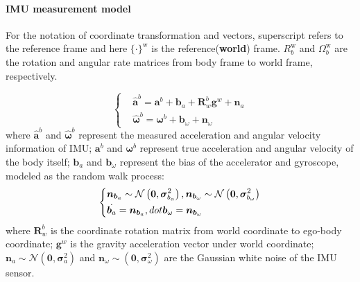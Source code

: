 \documentclass[12pt]{article}   %
\begin{document}
\paragraph{IMU measurement model}
For the notation of coordinate transformation and vectors, superscript refers to
the reference frame and here $\{\cdot\}^{\mathrm{w}}$ is the
reference(\textbf{world}) frame. $R_b^{\mathrm{w}}$ and $\Omega_b^{\mathrm{w}}$
are the rotation and angular rate matrices from body frame to world frame,
respectively.


\begin{equation}
	\left\{
	\begin{aligned}
	&\hat{\bm{a}}^b=\bm{a}^b+\bm{b}_a+\bm{R}_w^b\bm{g}^w+\bm{n}_a\\
	&\hat{\bm{\omega}}^b=\bm{\omega}^b+\bm{b}_\omega+\bm{n}_\omega
	\end{aligned}
	\right.
	\label{eq.measurement_model}
\end{equation}
where $\hat{\bm{a}}^b$ and $\hat{\bm{\omega}}^b$ represent the measured
acceleration and angular velocity information of IMU; $\bm{a}^b$ and
$\bm{\omega}^b$ represent true acceleration and angular velocity of the body
itself; $\bm{b}_a$ and $\bm{b}_\omega$ represent the bias of the accelerator and
gyroscope, modeled as the random walk process:
\begin{equation}
\centering
	\left\{
	\begin{aligned}
	&\bm{n}_{\bm{b}_a}\sim\mathcal{N}\left(\bm{0},\bm{\sigma}_{b_a}^2\right),\bm{n}_{\bm{b}_\omega}\sim\mathcal{N}\left(\bm{0},\bm{\sigma}_{b_\omega}^2\right)\\
	&\dot{\bm{b}_a}=\bm{n}_{\bm{b}_a},dot{\bm{b}_\omega}=\bm{n}_{\bm{b}_\omega}
	\end{aligned}
	\right.
	\label{eq.error_model}
\end{equation}
where $\bm{R}_w^b$ is the coordinate rotation matrix from world coordinate to
ego-body coordinate; $\bm{g}^w$ is the gravity acceleration vector under world
coordinate; $\bm{n}_a\sim\mathcal{N}\left(\bm{0},\bm{\sigma}_a^2\right)$ and
$\bm{n}_\omega\sim\left(\bm{0},\bm{\sigma}_\omega^2\right)$ are the Gaussian
white noise of the IMU sensor.
	
\end{document}
